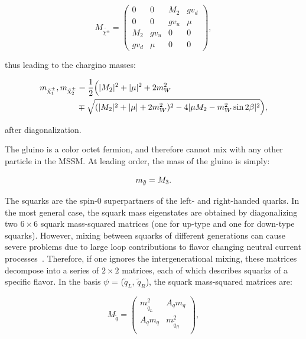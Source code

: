 \begin{equation}
M_{\tilde{\chi^{\pm}}} = 
\left(\begin{matrix}
0               & 0             & M_2             & g v_d \\
0               & 0             & g v_u           & \mu \\
M_2             & g v_u         & 0               & 0 \\
g v_d           & \mu           & 0               & 0 
\end{matrix}\right),
\label{eq:SUSYMSSMCharginoMassMatrix}
\end{equation}

\noindent thus leading to the chargino masses:

\begin{equation}
\begin{split}
m_{\chinoonepm}, m_{\chinotwopm} &= \frac{1}{2} \Bigl( |M_2|^2 + |\mu|^2 + 2m^2_W \\
& \mp \sqrt{(|M_2|^2 + |\mu| + 2m_W^2)^2 - 4|\mu M_2 - m_W^2 \sin{2\beta}|^2} \Bigr),
\end{split}
\label{eq:SUSYMSSMCharginoMasses}
\end{equation}

\noindent after diagonalization.

The gluino is a color octet fermion, and therefore cannot mix with any other particle in the MSSM.
At leading order, the mass of the gluino is simply:

\begin{equation}
m_{\tilde{g}} = M_3.
\label{eq:SUSYMSSMGluinoMasses}
\end{equation}

The squarks are the spin-0 superpartners of the left- and right-handed quarks.
In the most general case, the squark mass eigenstates are obtained by diagonalizing two $6\times 6$ squark mass-squared matrices (one for up-type and one for down-type squarks).
However, mixing between squarks of different generations can cause severe problems due to large loop contributions to flavor changing neutral current processes~\cite{Ellis:1981ts}.
Therefore, if one ignores the intergenerational mixing, these matrices decompose into a series of $2\times2$ matrices, each of which describes squarks of a specific flavor.
In the basis  $\psi$ = ($\tilde{q}_L$, $\tilde{q}_R$), the squark mass-squared matrices are:

\begin{equation}
M_{\tilde{q}} = 
\left(\begin{matrix}
m^2_{\tilde{q}_L}               & A_q m_q  \\
A_q m_q                         & m^2_{\tilde{q}_R}  \\
\end{matrix}\right),
\label{eq:SUSYMSSMSquarkMassMatrix}
\end{equation}

